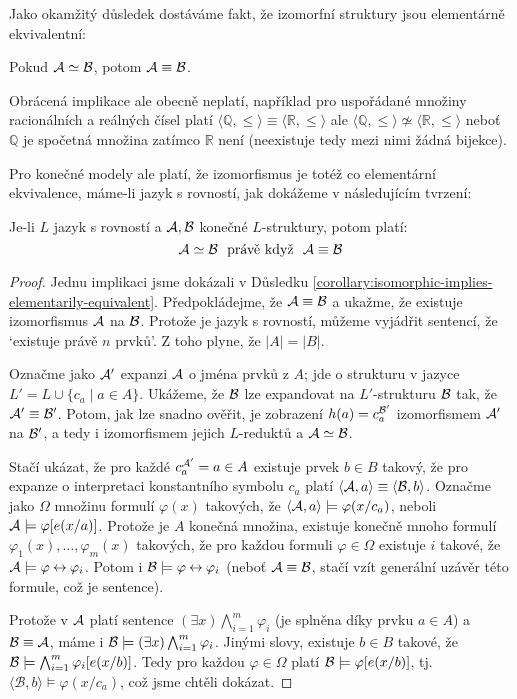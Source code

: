 Jako okamžitý důsledek dostáváme fakt, že izomorfní struktury jsou elementárně ekvivalentní:

\begin{corollary}\label{corollary:isomorphic-implies-elementarily-equivalent}
    Pokud $\mathcal{A}\simeq\mathcal{B}$, potom $\mathcal{A}\equiv\mathcal{B}$.
\end{corollary}

\begin{remark}
    Obrácená implikace ale obecně neplatí, například pro uspořádané množiny racionálních a reálných čísel platí $\langle\mathbb Q,\leq \rangle\equiv\langle\mathbb R,\leq\rangle$ ale $\langle\mathbb Q,\leq \rangle\not\simeq \langle \mathbb R,\leq\rangle$ neboť $\mathbb Q$ je spočetná množina zatímco $\mathbb R$ není (neexistuje tedy mezi nimi žádná bijekce).
\end{remark}

Pro konečné modely ale platí, že izomorfismus je totéž co elementární ekvivalence, máme-li jazyk s rovností, jak dokážeme v následujícím tvrzení:

\begin{proposition}
    Je-li $L$ jazyk s rovností a $\mathcal{A},\mathcal{B}$ konečné $L$-struktury, potom platí:
    $$
    \mathcal{A}\simeq\mathcal{B}\ \text{ právě když }\ \mathcal{A}\equiv\mathcal{B}
    $$
\end{proposition}
\begin{proof}
    Jednu implikaci jsme dokázali v Důsledku \ref{corollary:isomorphic-implies-elementarily-equivalent}. Předpokládejme, že $\mathcal{A}\equiv\mathcal{B}$ a ukažme, že existuje izomorfismus $\mathcal{A}$ na $\mathcal{B}$. Protože je jazyk s rovností, můžeme vyjádřit sentencí, že `existuje právě $n$ prvků'. Z toho plyne, že $|A|=|B|$.

    Označme jako $\mathcal{A}'$ expanzi $\mathcal{A}$ o jména prvků z $A$; jde o strukturu v jazyce $L'=L\cup\{c_a\mid a\in A\}$. Ukážeme, že $\mathcal{B}$ lze expandovat na $L'$-strukturu $\mathcal{B}$ tak, že $\mathcal{A}'\equiv \mathcal{B}'$. Potom, jak lze snadno ověřit, je zobrazení $h(a)= c_a^{\mathcal{B}'}$ izomorfismem $\mathcal{A}'$ na $\mathcal{B}'$, a tedy i izomorfismem jejich $L$-reduktů a $\mathcal{A}\simeq\mathcal{B}$.

    Stačí ukázat, že pro každé $c_a^{\mathcal{A}'}=a\in A$ existuje prvek $b\in B$ takový, že pro expanze o interpretaci konstantního symbolu $c_a$ platí $\langle  \mathcal{A},a\rangle\equiv\langle\mathcal{B},b\rangle$. Označme jako $\Omega$ množinu formulí $\varphi(x)$ takových, že $\langle \mathcal{A},a\rangle \models \varphi(x/c_a)$, neboli $\mathcal{A}\models \varphi[e(x/a)]$. Protože je $A$ konečná množina, existuje konečně mnoho formulí $\varphi_1(x),\dots,\varphi_m(x)$ takových, že pro každou formuli $\varphi \in \Omega$ existuje $i$ takové, že $\mathcal{A}\models \varphi\mathbin{\leftrightarrow}\varphi_i$. Potom i $\mathcal{B}\models\varphi\mathbin{\leftrightarrow}\varphi_i$ (neboť $\mathcal{A}\equiv\mathcal{B}$, stačí vzít generální uzávěr této formule, což je sentence).
    
    Protože v $\mathcal{A}$ platí sentence $(\exists x)\bigwedge_{i=1}^m\varphi_i$ (je splněna díky prvku $a\in A$) a $\mathcal{B}\equiv\mathcal{A}$, máme i $\mathcal{B}\models (\exists x)\bigwedge_{i=1}^m\varphi_i$. Jinými slovy, existuje $b\in B$ takové, že $\mathcal{B}\models\bigwedge_{i=1}^m\varphi_i[e(x/b)]$. Tedy pro každou $\varphi\in \Omega$ platí $\mathcal{B}\models \varphi[e(x/b)]$, tj. $\langle\mathcal{B},b\rangle\models \varphi(x/c_a)$, což jsme chtěli dokázat.
\end{proof}

